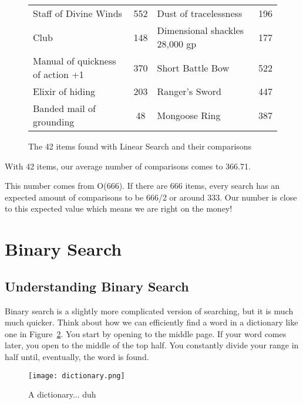 \documentclass[letterpaper, 10pt,DIV=13]{scrartcl}
\numberwithin{equation}{section} %
\numberwithin{figure}{section} %
\numberwithin{table}{section} %
\begin{document}
\begin{figure}[t]
\begin{tabular}{||lc||lc||}
Staff of Divine Winds & 552&Dust of tracelessness & 196\\
 
Club & 148&Dimensional shackles    28,000 gp & 177\\
 
Manual of quickness of action +1 & 370&Short Battle Bow & 522\\
 
Elixir of hiding & 203&Ranger's Sword & 447\\
 
Banded mail of grounding & 48&Mongoose Ring & 387\\
 


     \hline
    \end{tabular}
    \caption{The 42 items found with Linear Search and their comparisons}
    \label{figure:LinearResults}
\end{figure}

\pagebreak

With 42 items, our average number of comparisons comes to 366.71. 

This number comes from O(666). If there are 666 items, every search has an expected amount of comparisons to be 666/2 or around 333. Our number is close to this expected value which means we are right on the money!


\section{Binary Search}
\subsection{Understanding Binary Search}
Binary search is a slightly more complicated version of searching, but it is much much quicker. Think about how we can efficiently find a word in a dictionary like one in Figure~\ref{figure:Dictionary}. You start by opening to the middle page. If your word comes later, you open to the middle of the top half. You constantly divide your range in half until, eventually, the word is found.

\pagebreak

\begin{figure}[ht] 
    \centering 
    \texttt{[image: dictionary.png]}
    \caption{A dictionary... duh\footnotemark}
    \label{figure:Dictionary}
    
\end{figure}
\end{document}

